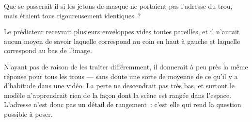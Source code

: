 \begin{exercice}
Que se passerait-il si les jetons de masque ne portaient pas l'adresse du
trou, mais étaient tous rigoureusement identiques~?
\end{exercice}

\begin{solution}
Le prédicteur recevrait plusieurs enveloppes vides toutes
pareilles, et il n'aurait aucun moyen de savoir laquelle correspond
au coin en haut à gauche et laquelle correspond au bas de l'image.

N'ayant pas de raison de les traiter différemment, il donnerait à peu près
la même réponse pour tous les trous — sans doute une sorte de moyenne de ce
qu'il y a d'habitude dans une vidéo. La perte ne descendrait pas très bas, et
surtout le modèle n'apprendrait rien de la façon dont la scène est rangée
dans l'espace.
L'adresse n'est donc pas un détail de rangement~: c'est elle qui rend la
question possible à poser.
\end{solution}
